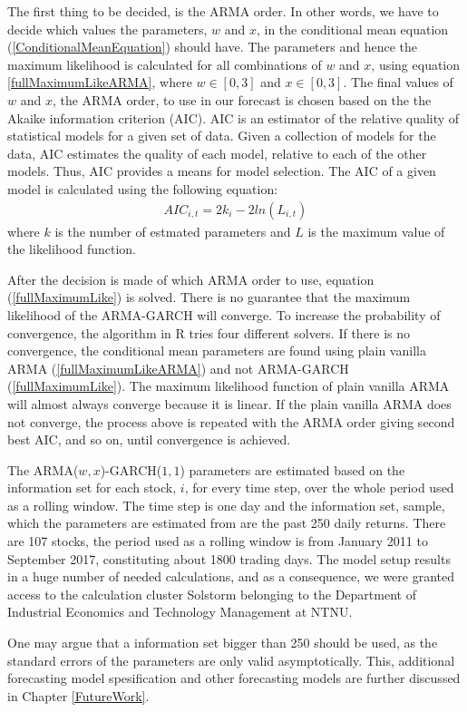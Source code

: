 The first thing to be decided, is the ARMA order. In other words, we have to decide which values the parameters, $w$ and $x$, in the conditional mean equation (\ref{ConditionalMeanEquation}) should have. The parameters and hence the maximum likelihood is calculated for all combinations of $w$ and $x$, using equation \ref{fullMaximumLikeARMA}, where $w\in[0,3]$ and $x\in[0,3]$. The final values of $w$ and $x$, the ARMA order, to use in our forecast is chosen based on the the Akaike information criterion (AIC). AIC is an estimator of the relative quality of statistical models for a given set of data. Given a collection of models for the data, AIC estimates the quality of each model, relative to each of the other models. Thus, AIC provides a means for model selection. The AIC of a given model is calculated using the following equation:
\begin{align}
    AIC_{i,t}=2k_i-2ln(L_{i,t})
\end{align}
where $k$ is the number of estmated parameters and $L$ is the maximum value of the likelihood function. 

After the decision is made of which ARMA order to use, equation (\ref{fullMaximumLike}) is solved. There is no guarantee that the maximum likelihood of the ARMA-GARCH will converge. To increase the probability of convergence, the algorithm in R tries four different solvers. If there is no convergence, the conditional mean parameters are found using plain vanilla ARMA (\ref{fullMaximumLikeARMA}) and not ARMA-GARCH (\ref{fullMaximumLike}). The maximum likelihood function of plain vanilla ARMA will almost always converge because it is linear. If the plain vanilla ARMA does not converge, the process above is repeated with the ARMA order giving second best AIC, and so on, until convergence is achieved.

The ARMA($w,x$)-GARCH($1,1$) parameters are estimated based on the information set for each stock, $i$, for every time step, over the whole period used as a rolling window. The time step is one day and the information set, sample, which the parameters are estimated from are the past 250 daily returns. There are 107 stocks, the period used as a rolling window is from January 2011 to September 2017, constituting about 1800 trading days. The model setup results in a huge number of needed calculations, and as a consequence, we were granted access to the calculation cluster Solstorm belonging to the Department of Industrial Economics and Technology Management at NTNU. 

One may argue that a information set bigger than 250 should be used, as the standard errors of the parameters are only valid asymptotically. This, additional forecasting model spesification and other forecasting models are further discussed in Chapter \ref{FutureWork}.


